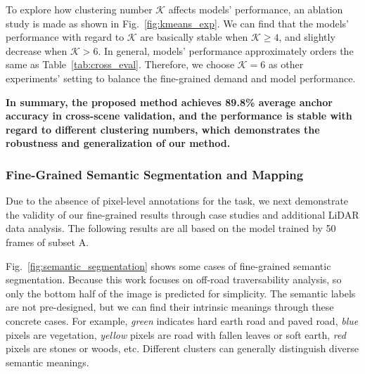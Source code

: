 \documentclass[letterpaper, 10 pt, conference]{ieeeconf}  %
\begin{document}
	To explore how clustering number $\mathcal{K}$ affects models' performance, an ablation study is made as shown in Fig.~\ref{fig:kmeans_exp}. We can find that the models' performance with regard to $\mathcal{K}$ are basically stable when $\mathcal{K} \geq 4$, and slightly decrease when $\mathcal{K}>6$. In general, models' performance approximately orders the same as Table~\ref{tab:cross_eval}. Therefore, we choose $\mathcal{K}=6$ as other experiments' setting to balance the fine-grained demand and model performance.
	
	\textbf{In summary, the proposed method achieves 89.8\% average anchor accuracy in cross-scene validation, and the performance is stable with regard to different clustering numbers, which demonstrates the robustness and generalization of our method.}
	
	
	\subsubsection{Fine-Grained Semantic Segmentation and Mapping}
	
	Due to the absence of pixel-level annotations for the task, we next demonstrate the validity of our fine-grained results through case studies and additional LiDAR data analysis. The following results are all based on the model trained by 50 frames of subset A.
	
	Fig.~\ref{fig:semantic_segmentation} shows some cases of fine-grained semantic segmentation. Because this work focuses on off-road traversability analysis, so only the bottom half of the image is predicted for simplicity. The semantic labels are not pre-designed, but we can find their intrinsic meanings through these concrete cases. For example, \textit{green} indicates hard earth road and paved road, \textit{blue} pixels are vegetation, \textit{yellow} pixels are road with fallen leaves or soft earth, \textit{red} pixels are stones or woods, etc. Different clusters can generally distinguish diverse semantic meanings.
	
\end{document}
